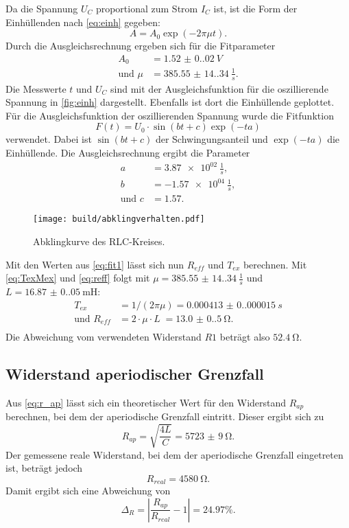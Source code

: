 Da die Spannung $U_C$ proportional zum Strom $I_C$ ist, ist die Form der Einhüllenden nach \autoref{eq:einh} gegeben:
\begin{equation*}
  A = A_0 \exp(-2 \pi \mu t).
\end{equation*}
Durch die Ausgleichsrechnung ergeben sich für die Fitparameter
\begin{align}
  A_0 &= \SI{1.52(0.02)}{V} \\
  \text{und } \mu &= \SI{385.55(14.34)}{\frac{1}{s}}.
  \label{eq:fit1}
\end{align}
Die Messwerte $t$ und $U_C$ sind mit der Ausgleichsfunktion für die oszillierende Spannung in \autoref{fig:einh} dargestellt. Ebenfalls ist dort die Einhüllende
geplottet.
Für die Ausgleichsfunktion der oszillierenden Spannung wurde die Fitfunktion
\begin{equation*}
  F(t) = U_0 \cdot \sin(bt+c) \exp(-ta)
\end{equation*}
verwendet. Dabei ist $\sin(bt+c)$ der Schwingungsanteil und $\exp(-ta)$ die Einhüllende. 
Die Ausgleichsrechnung ergibt die Parameter
\begin{align*}
  a &= \SI{3.87e02}{\frac{1}{s}},\\
  b &= \SI{-1.57e04}{\frac{1}{s}},\\
  \text{und } c &= \SI{1.57}.
\end{align*}
\begin{figure}[H]
  \texttt{[image: build/abklingverhalten.pdf]}
  \caption{Abklingkurve des RLC-Kreises.}
  \label{fig:einh}
\end{figure}
Mit den Werten aus \autoref{eq:fit1} lässt sich nun $R_{eff}$ und $T_{ex}$ berechnen. Mit \autoref{eq:TexMex} und \autoref{eq:reff} folgt mit 
$\mu = \SI{385.55(14.34)}{\frac{1}{s}}$ und $L = \SI{16.87(0.05)}{\milli\henry}$:
\begin{align*}
  T_{ex} &= 1/(2\pi\mu)                      = \SI{0.000413(0.000015)}{s}\\
  \text{und } R_{eff} &= 2 \cdot \mu \cdot L \; = \SI{13.0(0.5)}{\ohm}.\\
\end{align*}
Die Abweichung vom verwendeten Widerstand $R1$ beträgt also $\SI{52.4}{\ohm}$.

\subsection{Widerstand aperiodischer Grenzfall}
Aus \autoref{eq:r_ap} lässt sich ein theoretischer Wert für den Widerstand $R_{ap}$ berechnen, bei dem der aperiodische Grenzfall eintritt.
Dieser ergibt sich zu
\begin{equation*}
  R_{ap} = \sqrt{\frac{4L}{C}} = \SI{5723(9)}{\ohm}.
\end{equation*}
Der gemessene reale Widerstand, bei dem der aperiodische Grenzfall eingetreten ist, beträgt jedoch
\begin{equation*}
  R_{real} = \SI{4580}{\ohm}.
\end{equation*}
Damit ergibt sich eine Abweichung von
\begin{equation*}
  \Delta_R = |\frac{R_{ap}}{R_{real}} - 1| = 24.97\%.
\end{equation*}

